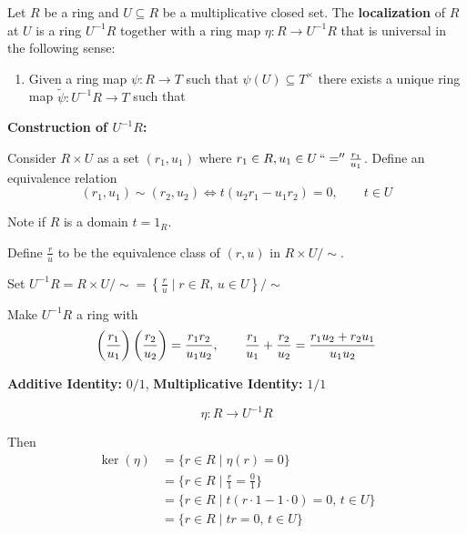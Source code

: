 \documentclass[12pt]{amsart}
\begin{document}
\begin{definition}
    Let $R$ be a ring and $U \subseteq R$ be a multiplicative closed set. The \textbf{localization} of $R$ at $U$ is a ring $U^{-1}R$ together with a ring map $\eta: R \to U^{-1}R$ that is universal in the following sense: 
    \begin{enumerate}
        \item Given a ring map $\psi: R \to T$ such that $\psi(U)\subseteq T^\times$ there exists a unique ring map $\widetilde{\psi}: U^{-1}R \to T$ such that 
        \begin{center}
        \end{center}
    \end{enumerate}
\end{definition}

\textbf{Construction of $U^{-1}R$:}

Consider $R \times U$ as a set $(r_1, u_1)$ where $r_1 \in R, u_1 \in U \, ``='' \frac{r_1}{u_1}$. Define an equivalence relation 
\[(r_1, u_1) \sim (r_2, u_2) \iff t(u_2r_1 - u_1r_2) = 0, \qquad t \in U\]

Note if $R$ is a domain $t = 1_R$.

Define $\frac{r}{u}$ to be the equivalence class of $(r,u)$ in $R \times U / \sim$. 

Set $U^{-1}R = R \times U / \sim = \left\{ \frac{r}{u} \mid r \in R, \, u \in U\right\} / \sim$

Make $U^{-1}R$ a ring with 
\[\left(\frac{r_1}{u_1}\right)\left(\frac{r_2}{u_2}\right) = \frac{r_1r_2}{u_1u_2}, \qquad \frac{r_1}{u_1} + \frac{r_2}{u_2} = \frac{r_1u_2 + r_2u_1}{u_1u_2}\]

\textbf{Additive Identity:} $0/1$, 
\textbf{Multiplicative Identity:} $1/1$

\[\eta: R \to U^{-1}R\]

Then 
\begin{align*}
    \ker(\eta) &= \{r \in R \mid \eta(r) =0\} \\
    &= \{r \in R \mid \frac{r}{1} = \frac{0}{1}\} \\
    &= \{r \in R \mid t(r \cdot 1 - 1 \cdot 0) =0, \, t \in U\} \\
    &= \{r \in R \mid tr  =0, \, t \in U\} 
\end{align*}
\end{document}
